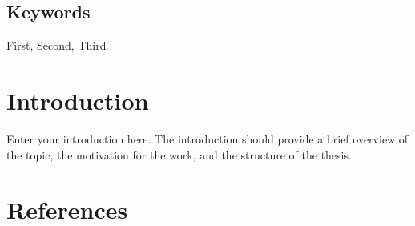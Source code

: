 \documentclass[11pt,        %
  ngerman,english,          %
  paper=a4,                 %
  captions=tablesignature,  %
  listof=numbered,          %
  bibliography=totoc,       %
  headings=small,           %
  headinclude=false,        %
  footinclude=false,        %
  parskip=half-,            %
  oneside,                  %
  BCOR=15mm,                %
  DIV=12                    %
  ]{scrbook}                %
\begin{document}
\section*{Keywords} First, Second, Third
\clearpage
\setcounter{tocdepth}{1}
\tableofcontents

\mainmatter

\chapter{Introduction}\label{chapter:introduction}
Enter your introduction here. The introduction should provide a brief overview of the topic, the motivation for the work, and the structure of the thesis.\cite{bringhurst-2005-elements_typographic_style}

\backmatter

\cleardoublepage
{}
\listoffigures

\cleardoublepage
{}
\listoftables

\cleardoublepage
{}
\lstlistoflistings

\chapter{References}\label{sec:references}
\renewcommand{\bibname}{References}



\glsaddall
\printglossary[type=\acronymtype,title=List of Abbreviations,style=imaiabk,toctitle=List of Abbreviations]
\printglossary[style=imai]

\renewcommand{\thechapter}{\Alph{chapter}}
\renewcommand{\thesection}{\Alph{section}}
\renewcommand{\thesubsection}{\Alph{section}.\arabic{subsection}}
\setcounter{section}{0}
\addtocounter{chapter}{1}
\end{document}
